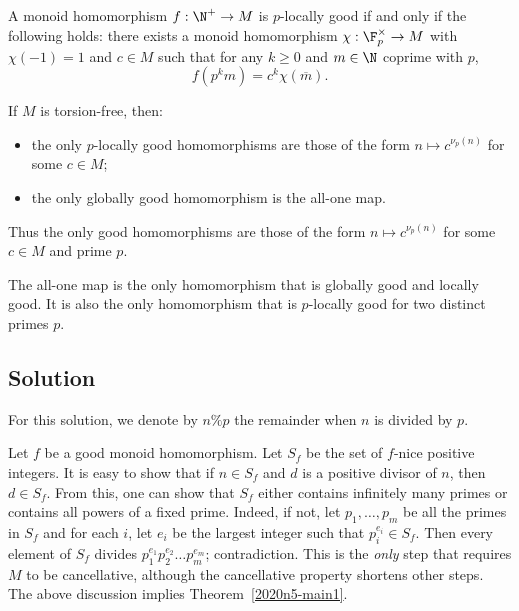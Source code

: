 \begin{theorem}\label{2020n5-main2}
A monoid homomorphism $f : \N^+ \to M$ is $p$-locally good if and only if the following holds:
    there exists a monoid homomorphism $\chi : \F_p^{\times} \to M$ with $\chi(-1) = 1$ and $c \in M$ such that for any $k \geq 0$ and $m \in \N$ coprime with $p$,
\[ f(p^k m) = c^k \chi(\overline{m}). \]
\end{theorem}

\begin{theorem}\label{2020n5-main3}
If $M$ is torsion-free, then:
\begin{itemize}
    \item   the only $p$-locally good homomorphisms are those of the form $n \mapsto c^{\nu_p(n)}$ for some $c \in M$;
    \item   the only globally good homomorphism is the all-one map.
\end{itemize}
Thus the only good homomorphisms are those of the form $n \mapsto c^{\nu_p(n)}$ for some $c \in M$ and prime $p$.
\end{theorem}

\begin{theorem}\label{2020n5-main4}
The all-one map is the only homomorphism that is globally good and locally good.
It is also the only homomorphism that is $p$-locally good for two distinct primes $p$.
\end{theorem}



\subsection*{Solution}

For this solution, we denote by $n \% p$ the remainder when $n$ is divided by $p$.

Let $f$ be a good monoid homomorphism.
Let $S_f$ be the set of $f$-nice positive integers.
It is easy to show that if $n \in S_f$ and $d$ is a positive divisor of $n$, then $d \in S_f$.
From this, one can show that $S_f$ either contains infinitely many primes or contains all powers of a fixed prime.
Indeed, if not, let $p_1, \ldots, p_m$ be all the primes in $S_f$ and for each $i$, let $e_i$ be the largest integer such that $p_i^{e_i} \in S_f$.
Then every element of $S_f$ divides $p_1^{e_1} p_2^{e_2} \ldots p_m^{e_m}$; contradiction.
This is the \textit{only} step that requires $M$ to be cancellative, although the cancellative property shortens other steps.
The above discussion implies Theorem~\ref{2020n5-main1}.

